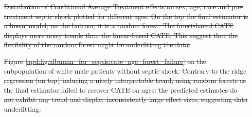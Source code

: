 \documentclass[10pt,letterpaper]{article}
\providecommand{\DIFdeltex}[1]{{\protect\color{red}\sout{#1}}}                      %
\providecommand{\DIFdelbegin}{} %
\providecommand{\DIFdelend}{} %
\providecommand{\DIFdelFL}[1]{\DIFdel{#1}} %
\providecommand{\DIFdel}[1]{\texorpdfstring{\DIFdeltex{#1}}{}} %
\newcommand{\DIFscaledelfig}{0.5}
\newlength{\DIFdelgraphicswidth} %
\newlength{\DIFdelgraphicsheight} %
\newcommand{\DIFdelincludegraphics}[2][]{%
\sbox{\DIFdelgraphicsbox}{\DIFOincludegraphics[#1]{#2}}%
\settoboxwidth{\DIFdelgraphicswidth}{\DIFdelgraphicsbox} %
\settoboxtotalheight{\DIFdelgraphicsheight}{\DIFdelgraphicsbox} %
\scalebox{\DIFscaledelfig}{%
\parbox[b]{\DIFdelgraphicswidth}{\usebox{\DIFdelgraphicsbox}\\[-\baselineskip] \rule{\DIFdelgraphicswidth}{0em}}\llap{\resizebox{\DIFdelgraphicswidth}{\DIFdelgraphicsheight}{%
\setlength{\unitlength}{\DIFdelgraphicswidth}%
\begin{picture}(1,1)%
\thicklines\linethickness{2pt} %
{\color[rgb]{1,0,0}\put(0,0){\framebox(1,1){}}}%
{\color[rgb]{1,0,0}\put(0,0){\line( 1,1){1}}}%
{\color[rgb]{1,0,0}\put(0,1){\line(1,-1){1}}}%
\end{picture}%
}\hspace*{3pt}}} %
} %
\DeclareRobustCommand{\DIFdelbegin}{\DIFOdelbegin \let\includegraphics\DIFdelincludegraphics} %
\DeclareRobustCommand{\DIFdelend}{\DIFOaddend \let\includegraphics\DIFOincludegraphics} %
\begin{document}
{%
  \DIFdelFL{Distribution of Conditional Average Treatment effects on sex, age,
    race and pre-treatment septic shock plotted for different ages. On the top
    the final estimator is a linear model; on the bottom, it is a random
    forest. The forest-based CATE displays more noisy trends than the
    linear-based CATE. This suggest that the flexibility of the random forest
    might be underfitting the data.}}%
\DIFdelend

\DIFdelbegin %
{%
  \DIFdelFL{Figure \ref{apd:fig:albumin_for_sepsis:cate_age_forest_failure} on
    the subpopulation of white male patients without septic shock. Contrary to
    the ridge regression (on top) inducing a nicely interpretable trend, using
    random forests as the final estimator failed to recover CATE on ages: the
    predicted estimates do not exhibit any trend and display inconsistently
    large effect sizes, suggesting data underfitting.
  }}%



\end{document}
